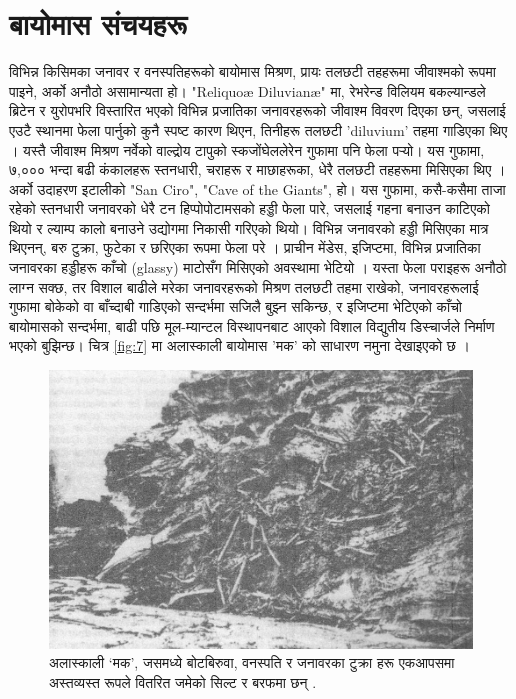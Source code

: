 \documentclass[10pt,twocolumn,letterpaper]{article}
\begin{document}
\section{बायोमास संचयहरू}

विभिन्न किसिमका जनावर र वनस्पतिहरूको बायोमास मिश्रण, प्रायः तलछटी तहहरूमा जीवाश्मको रूपमा पाइने, अर्को अनौठो असामान्यता हो। "Reliquoæ Diluvianæ" मा, रेभरेन्ड विलियम बकल्यान्डले ब्रिटेन र युरोपभरि विस्तारित भएको विभिन्न प्रजातिका जनावरहरूको जीवाश्म विवरण दिएका छन्, जसलाई एउटै स्थानमा फेला पार्नुको कुनै स्पष्ट कारण थिएन, तिनीहरू तलछटी 'diluvium' तहमा गाडिएका थिए \cite{58}। यस्तै जीवाश्म मिश्रण नर्वेको वाल्द्रोय टापुको स्कजोंघेललेरेन गुफामा पनि फेला पर्‍यो। यस गुफामा, ७,००० भन्दा बढी कंकालहरू स्तनधारी, चराहरू र माछाहरूका, धेरै तलछटी तहहरूमा मिसिएका थिए \cite{59}। अर्को उदाहरण इटालीको "San Ciro", "Cave of the Giants", हो। यस गुफामा, कसै-कसैमा ताजा रहेको स्तनधारी जनावरको धेरै टन हिप्पोपोटामसको हड्डी फेला पारे, जसलाई गहना बनाउन काटिएको थियो र ल्याम्प कालो बनाउने उद्योगमा निकासी गरिएको थियो। विभिन्न जनावरको हड्डी मिसिएका मात्र थिएनन्, बरु टुक्रा, फुटेका र छरिएका रूपमा फेला परे \cite{60,61}। प्राचीन मेंडेस, इजिप्टमा, विभिन्न प्रजातिका जनावरका हड्डीहरू काँचो (glassy) माटोसँग मिसिएको अवस्थामा भेटियो \cite{57}। यस्ता फेला पराइहरू अनौठो लाग्न सक्छ, तर विशाल बाढीले मरेका जनावरहरूको मिश्रण तलछटी तहमा राखेको, जनावरहरूलाई गुफामा बोकेको वा बाँच्दाबी गाडिएको सन्दर्भमा सजिलै बुझ्न सकिन्छ, र इजिप्टमा भेटिएको काँचो बायोमासको सन्दर्भमा, बाढी पछि मूल-म्यान्टल विस्थापनबाट आएको विशाल विद्युतीय डिस्चार्जले निर्माण भएको बुझिन्छ। चित्र \ref{fig:7} मा अलास्काली बायोमास 'मक' को साधारण नमुना देखाइएको छ \cite{56}।
\begin{figure}[t]
\begin{center}
   \includegraphics[width=1\linewidth]{muck-crop.jpeg}
\end{center}
   \caption{अलास्काली ‘मक’, जसमध्ये बोटबिरुवा, वनस्पति र जनावरका टुक्रा हरू एकआपसमा अस्तव्यस्त रूपले वितरित जमेको सिल्ट र बरफमा छन् \cite{146}.}
\label{fig:7}
\label{fig:onecol}
\end{figure}
\end{document}
